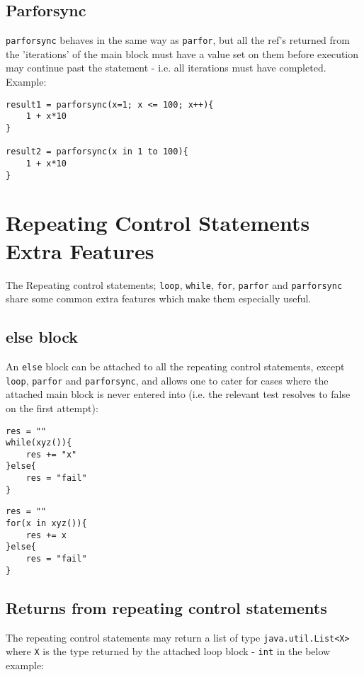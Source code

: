 \documentclass[conc-doc]{subfiles}
\begin{document}
\subsection{Parforsync}
\lstinline{parforsync} behaves in the same way as \lstinline{parfor}, but all the ref's returned from the 'iterations' of the main block must have a value set on them before execution may continue past the statement - i.e. all iterations must have completed. Example:

\begin{lstlisting}
result1 = parforsync(x=1; x <= 100; x++){
	1 + x*10
}

result2 = parforsync(x in 1 to 100){
	1 + x*10
}
\end{lstlisting}

\section{Repeating Control Statements Extra Features}
The Repeating control statements; \lstinline{loop}, \lstinline{while}, \lstinline{for}, \lstinline{parfor} and \lstinline{parforsync} share some common extra features which make them especially useful.

\subsection{else block}
\label{subsec:forelseblock}
An \lstinline{else} block can be attached to all the repeating control statements, except \lstinline{loop}, \lstinline{parfor} and \lstinline{parforsync}, and allows one to cater for cases where the attached main block is never entered into (i.e. the relevant test resolves to false on the first attempt):

\begin{lstlisting}
res = ""
while(xyz()){
	res += "x"	
}else{
	res = "fail"
}
\end{lstlisting}

\begin{lstlisting}
res = ""
for(x in xyz()){
	res += x	
}else{
	res = "fail"
}
\end{lstlisting}

\subsection{Returns from repeating control statements}
The repeating control statements may return a list of type \lstinline{java.util.List<X>} where \lstinline{X} is the type returned by the attached loop block - \lstinline{int} in the below example:
\end{document}
